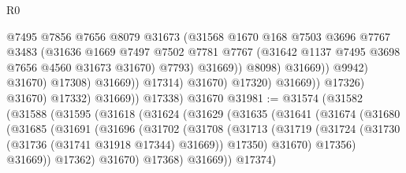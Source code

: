 \begin{lexlean}{R0}
\begin{coremodule}
                                            @7495
                                            @7856
                                            @7656
                                            @8079
                                            @31673
                                            (@31568
                                              @1670
                                              @168
                                              @7503
                                              @3696
                                              @7767
                                              @3483
                                              (@31636
                                                @1669
                                                @7497
                                                @7502
                                                @7781
                                                @7767
                                                (@31642 @1137 @7495 @3698 @7656 @4560 @31673 @31670)
                                                @7793)
                                              @31669))
                                          @8098)
                                        @31669))
                                    @9942)
                                  @31670)
                                @17308)
                              @31669))
                          @17314)
                        @31670)
                      @17320)
                    @31669))
                @17326)
              @31670)
            @17332)
          @31669))
      @17338)
    @31670
@31981 := @31574
    (@31582
      (@31588
        (@31595
          (@31618
            (@31624
              (@31629
                (@31635
                  (@31641
                    (@31674
                      (@31680
                        (@31685
                          (@31691
                            (@31696
                              (@31702
                                (@31708
                                  (@31713
                                    (@31719
                                      (@31724
                                        (@31730 (@31736 (@31741 @31918 @17344) @31669))
                                        @17350)
                                      @31670)
                                    @17356)
                                  @31669))
                              @17362)
                            @31670)
                          @17368)
                        @31669))
                    @17374)

\end{coremodule}
\end{lexlean}
